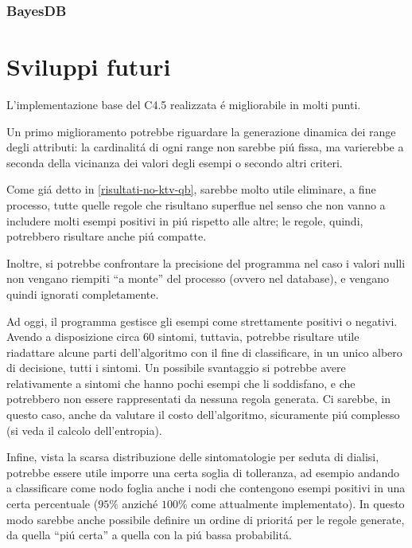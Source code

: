 \documentclass[preprint]{acm_proc_article-sp}
\begin{document}
\subsubsection{BayesDB}


\section{Sviluppi futuri}
\label{sviluppi-futuri}
L'implementazione base del C4.5 realizzata \'e migliorabile in molti punti.

Un primo miglioramento potrebbe riguardare la generazione dinamica dei range degli attributi: la cardinalit\'a di ogni range non sarebbe pi\'u fissa, ma varierebbe a seconda della vicinanza dei valori degli esempi o secondo altri criteri.

Come gi\'a detto in \ref{risultati-no-ktv-qb}, sarebbe molto utile eliminare, a fine processo, tutte quelle regole che risultano superflue nel senso che non vanno a includere molti esempi positivi in pi\'u rispetto alle altre; le regole, quindi, potrebbero risultare anche pi\'u compatte.

Inoltre, si potrebbe confrontare la precisione del programma nel caso i valori nulli non vengano riempiti ``a monte'' del processo (ovvero nel database), e vengano quindi ignorati completamente.

Ad oggi, il programma gestisce gli esempi come strettamente positivi o negativi. Avendo a disposizione circa $60$ sintomi, tuttavia, potrebbe risultare utile riadattare alcune parti dell'algoritmo con il fine di classificare, in un unico albero di decisione, tutti i sintomi. Un possibile svantaggio si potrebbe avere relativamente a sintomi che hanno pochi esempi che li soddisfano, e che potrebbero non essere rappresentati da nessuna regola generata. Ci sarebbe, in questo caso, anche da valutare il costo dell'algoritmo, sicuramente pi\'u complesso (si veda il calcolo dell'entropia).

Infine, vista la scarsa distribuzione delle sintomatologie per seduta di dialisi, potrebbe essere utile imporre una certa soglia di tolleranza, ad esempio andando a classificare come nodo foglia anche i nodi che contengono esempi positivi in una certa percentuale ($95\%$ anzich\'e $100\%$ come attualmente implementato). In questo modo sarebbe anche possibile definire un ordine di priorit\'a per le regole generate, da quella ``pi\'u certa'' a quella con la pi\'u bassa probabilit\'a.
\end{document}
